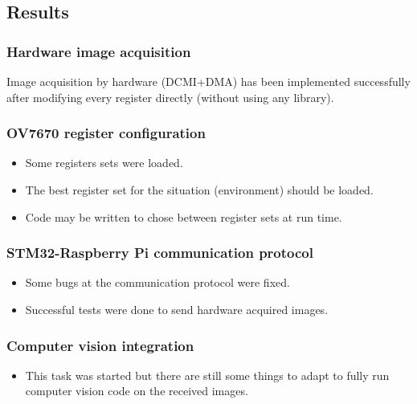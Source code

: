 \subsection{Results}

\subsubsection{Hardware image acquisition}
Image acquisition by hardware (DCMI+DMA) has been implemented successfully after modifying every register directly (without using any library).

\subsubsection{OV7670 register configuration}
\begin{itemize}
	\item Some registers sets were loaded.
	\item The best register set for the situation (environment) should be loaded.
	\item Code may be written to chose between register sets at run time.
\end{itemize}

\subsubsection{STM32-Raspberry Pi communication protocol}
\begin{itemize}
	\item Some bugs at the communication protocol were fixed.
	\item Successful tests were done to send hardware acquired images.
\end{itemize}

\subsubsection{Computer vision integration}
\begin{itemize}
	\item This task was started but there are still some things to adapt to fully run computer vision code on the received images.
\end{itemize}
